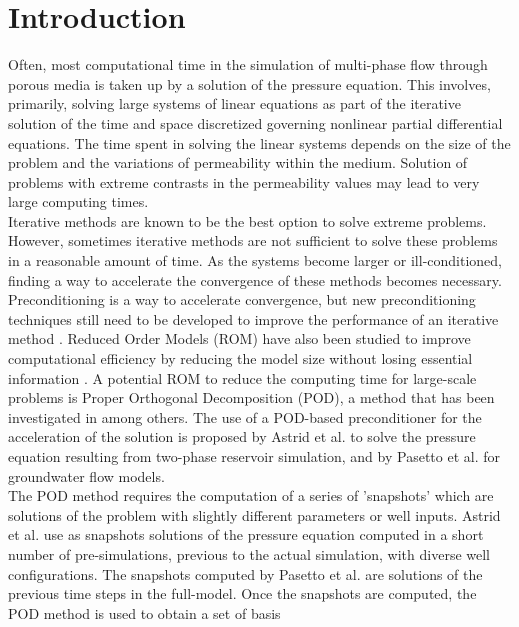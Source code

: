 \documentclass[review]{elsarticle}
\begin{document}
\linenumbers

\section{Introduction}
Often, most computational time in the simulation of multi-phase flow through porous media is taken 
  up by a solution of the pressure equation. 
This involves, primarily, solving large systems of linear equations as 
part of the iterative solution of the time and space discretized governing nonlinear partial differential 
equations. The time spent in solving the linear systems depends on the size of the problem and the 
variations of permeability within the medium. Solution of problems with extreme contrasts in the
permeability values may lead to very large computing times. \\
Iterative methods are known to be the best option to solve extreme problems. However, sometimes iterative methods are not sufficient to solve these problems in a reasonable amount of time. As the systems become larger or ill-conditioned, finding a way to accelerate the convergence of these methods becomes necessary. Preconditioning is a way to accelerate convergence, but new preconditioning techniques still need to be developed to improve the performance of an iterative method \cite{Vuik02,Benzi02}.
Reduced Order Models (ROM) have also been studied to improve computational efficiency by reducing the model size without losing essential information \cite{Heijn04,Barone09,Kala14}. 
A potential ROM to reduce the computing time for large-scale problems is Proper Orthogonal 
Decomposition (POD), a method that has been investigated in \cite{Kunisch02,Doren06,Astrid11,Mark06,Pasetto16,Carlberg15} among others. 
The use of a POD-based preconditioner for the acceleration of the solution is proposed by Astrid et al.
\cite{Astrid11} to solve the pressure equation resulting from two-phase reservoir simulation, and by Pasetto 
et al. \cite{Pasetto16} for groundwater flow models. \\
The POD method requires the computation of a series of 'snapshots' which are solutions of the problem with slightly 
different parameters or well inputs. Astrid et al. \cite{Astrid11} use as snapshots solutions of the pressure equation computed in a short number of pre-simulations, previous to the actual simulation, with diverse well configurations. The snapshots computed by Pasetto et al. \cite{Pasetto16} are solutions of the previous time steps in the full-model.
Once the snapshots are computed, the POD method is used to obtain a set of basis 
\end{document}

